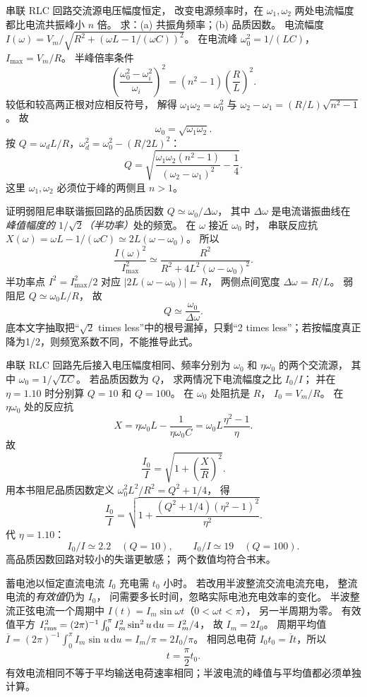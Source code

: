 串联 RLC 回路交流源电压幅度恒定，
改变电源频率时，在
$\omega_1,\omega_2$ 两处电流幅度都比电流共振峰小 $n$ 倍。
求：(a) 共振角频率；(b) 品质因数。
\exsolution
电流幅度
$I(\omega)=V_m/\sqrt{R^2+(\omega L-1/(\omega C))^2}$。
在电流峰 $\omega_0^2=1/(LC)$，
$I_{\max}=V_m/R$。
半峰倍率条件
\[
\left(\frac{\omega_0^2-\omega_i^2}{\omega_i}\right)^2
=(n^2-1)\left(\frac RL\right)^2.
\]
较低和较高两正根对应相反符号，
解得
$\omega_1\omega_2=\omega_0^2$ 与
$\omega_2-\omega_1=(R/L)\sqrt{n^2-1}$。
故
\[
\boxed{\omega_0=\sqrt{\omega_1\omega_2}}.
\]
按 $Q=\omega_dL/R$，$\omega_d^2=\omega_0^2-(R/2L)^2$：
\[
\boxed{Q=
\sqrt{\frac{\omega_1\omega_2(n^2-1)}
{(\omega_2-\omega_1)^2}-\frac14}}.
\]
\excheck 这里 $\omega_1,\omega_2$ 必须位于峰的两侧且 $n>1$。

证明弱阻尼串联谐振回路的品质因数
$Q\simeq\omega_0/\Delta\omega$，
其中 $\Delta\omega$ 是电流谐振曲线在
\emph{峰值幅度的 $1/\sqrt2$（半功率）}处的频宽。
\exsolution
在 $\omega$ 接近 $\omega_0$ 时，
串联反应抗
$X(\omega)=\omega L-1/(\omega C)
\simeq2L(\omega-\omega_0)$。
所以
\[
\frac{I(\omega)^2}{I_{\max}^2}
\simeq\frac{R^2}{R^2+
4L^2(\omega-\omega_0)^2}.
\]
半功率点
$I^2=I_{\max}^2/2$
对应
$|2L(\omega-\omega_0)|=R$，
两侧点间宽度
$\Delta\omega=R/L$。
弱阻尼
$Q\simeq\omega_0L/R$，
故
\[
\boxed{Q\simeq\frac{\omega_0}{\Delta\omega}}.
\]
\excheck 底本文字抽取把“$\sqrt2$ times less”中的根号漏掉，只剩“2 times less”；若按幅度真正降为1/2，则频宽系数不同，不能推导此式。

串联 RLC 回路先后接入电压幅度相同、频率分别为
$\omega_0$ 和 $\eta\omega_0$ 的两个交流源，
其中 $\omega_0=1/\sqrt{LC}$。
若品质因数为 $Q$，
求两情况下电流幅度之比 $I_0/I$；
并在 $\eta=1.10$ 时分别算
$Q=10$ 和 $Q=100$。
\exsolution
在 $\omega_0$ 处阻抗是 $R$，
$I_0=V_m/R$。
在 $\eta\omega_0$ 处的反应抗
\[
X=\eta\omega_0L-\frac1{\eta\omega_0C}
=\omega_0L\frac{\eta^2-1}{\eta}.
\]
故
\[
\frac{I_0}{I}=
\sqrt{1+\left(\frac X R\right)^2}.
\]
用本书阻尼品质因数定义
$\omega_0^2L^2/R^2=Q^2+1/4$，
得
\[
\boxed{\frac{I_0}{I}=
\sqrt{1+\frac{(Q^2+1/4)(\eta^2-1)^2}{\eta^2}}}.
\]
代 $\eta=1.10$：
\[
\boxed{I_0/I\simeq2.2\quad(Q=10)},\qquad
\boxed{I_0/I\simeq19\quad(Q=100)}.
\]
\excheck 高品质因数回路对较小的失谐更敏感；
两个数值均符合书末。

蓄电池以恒定直流电流 $I_0$ 充电需 $t_0$ 小时。
若改用半波整流交流电流充电，
整流电流的\emph{有效值}仍为 $I_0$，
问需要多长时间，忽略实际电池充电效率的变化。
\exsolution
半波整流正弦电流一个周期中
$I(t)=I_m\sin\omega t$（$0<\omega t<\pi$），
另一半周期为零。
有效值平方
$I_{\rm rms}^2=(2\pi)^{-1}\int_0^\pi I_m^2\sin^2u\,\mathrm du=I_m^2/4$，
故 $I_m=2I_0$。
周期平均值
$\overline I=(2\pi)^{-1}\int_0^\pi I_m\sin u\,\mathrm du=I_m/\pi=2I_0/\pi$。
相同总电荷
$I_0t_0=\overline It$，所以
\[
\boxed{t=\frac\pi2t_0}.
\]
\excheck 有效电流相同不等于平均输送电荷速率相同；半波电流的峰值与平均值都必须单独计算。

